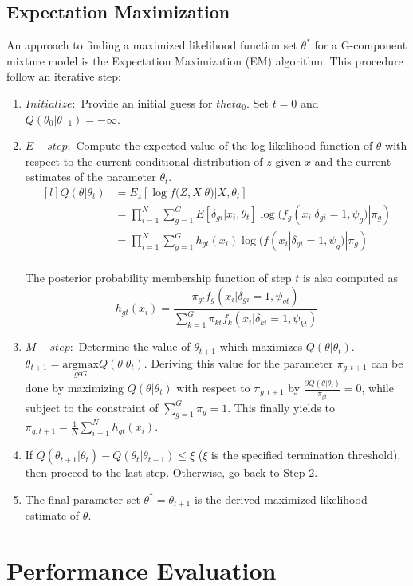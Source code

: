 \subsection{Expectation Maximization}
\label{sec:em}
An approach to finding a maximized likelihood function set \(\theta^*\) for a G-component mixture model is the Expectation Maximization (EM) algorithm. This procedure follow an iterative step:
\begin{enumerate}
    \item \(\mathit{Initialize: }\) Provide an initial guess for \(theta_0\). Set \(t=0\) and \(Q(\theta_0|\theta_{-1})=-\infty\).
    
    \item \(\mathit{E-step: }\) Compute the expected value of the log-likelihood function of \(\theta\) with respect to the current conditional distribution of \(z\) given \(x\) and the current estimates of the parameter \(\theta_t\).
    \[\begin{matrix*}[l]
        Q(\theta|\theta_t) & = E_z[\log f(Z,X|\theta) | X, \theta_t] \\ 
                           & = \prod_{i=1}^{N}\sum_{g=1}^{G}E[\delta_{gi}|x_i,\theta_t] \log(f_g(x_i|\delta_{gi}=1, \psi_g) | \pi_g) \\ 
                           & = \prod_{i=1}^{N}\sum_{g=1}^{G}h_{gt}(x_i) \log(f(x_i|\delta_{gi}=1, \psi_g) | \pi_g) \\ 
        \end{matrix*}\]
    
    The posterior probability membership function of step \(t\) is also computed as
        \[h_{gt}(x_i) = \frac{\pi_{gt}f_g(x_i|\delta_{gi}=1,\psi_{gt})}{\sum_{k=1}^{G}\pi_{kt}f_k(x_i|\delta_{ki}=1,\psi_{kt})}\]

    \item \(\mathit{M-step: }\) Determine the value of \(\theta_{t+1}\) which maximizes \(Q(\theta|\theta_t)\). \(\theta_{t+1}=\underset{g\epsilon G}{\mathrm{argmax}}{Q(\theta|\theta_t)}\). Deriving this value for the parameter \(\pi_{g,t+1}\) can be done by maximizing \(Q(\theta|\theta_t)\) with respect to \(\pi_{g,t+1}\) by \(\frac{\partial Q(\theta|\theta_t)}{\pi_{gt}}=0\), while subject to the constraint of \(\sum_{g=1}^{G}\pi_g=1\). This finally yields to \(\pi_{g,t+1}=\frac{1}{N}\sum_{i=1}^{N}h_{gt}(x_i)\).

    \item If \(Q(\theta_{t+1}|\theta_{t}) - Q(\theta_{t}|\theta_{t-1}) \le \xi \) (\(\xi \) is the specified termination threshold), then proceed to the last step. Otherwise, go back to Step 2.
    
    \item The final parameter set \(\theta^* = \theta_{t+1}\) is the derived maximized likelihood estimate of \(\theta\).
    
\end{enumerate}





\section{Performance Evaluation}
\label{sec:emclustering_ch3}
